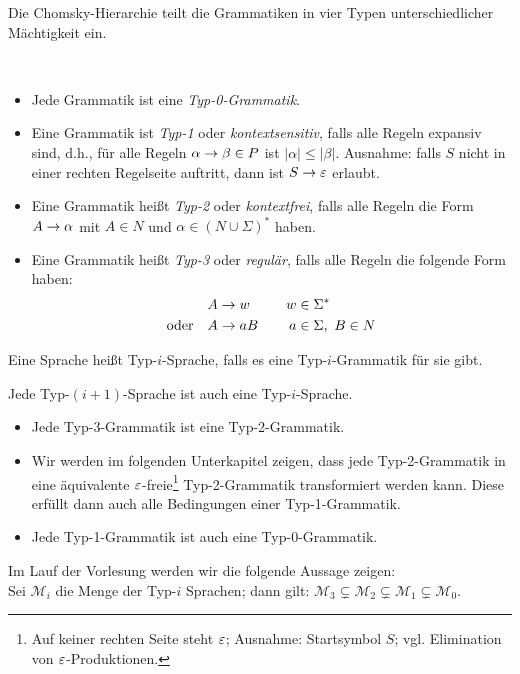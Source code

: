 \bigskip

Die Chomsky-Hierarchie teilt die Grammatiken in vier Typen unterschiedlicher Mächtigkeit ein.
\begin{Def}\
	\begin{itemize}
	\item Jede Grammatik ist eine \emph{Typ-0-Grammatik}.
	\item Eine Grammatik ist \emph{Typ-1} oder
          \emph{kontextsensitiv}, falls alle Regeln expansiv sind,
          d.h., für alle Regeln $\alpha\->\beta\in P$ ist
          $|\alpha|\leq |\beta|$. Ausnahme: falls $S$ nicht in einer
          rechten Regelseite auftritt, dann ist $S\->\Eps$ erlaubt. 
	\item Eine Grammatik heißt \emph{Typ-2} oder \emph{kontextfrei}, falls alle Regeln die Form $A\->\alpha$ mit $A\in N$ und $\alpha\in(N\cup\Sigma)^*$ haben.
	\item Eine Grammatik heißt \emph{Typ-3} oder \emph{regulär}, falls alle Regeln die folgende Form haben:
	\begin{alignat*}{2}
		&A\->w &\quad w&\in\Sigma^*\\
		\text{oder}\quad &A\->aB& a&\in\Sigma,\ B\in N
	\end{alignat*}
	\end{itemize}
	Eine Sprache heißt Typ-$i$-Sprache, falls es eine Typ-$i$-Grammatik für sie gibt.
\end{Def}

\begin{Beobachtung}
	Jede Typ-$(i+1)$-Sprache ist auch eine Typ-$i$-Sprache.
\end{Beobachtung}
\begin{itemize}
 \item Jede Typ-3-Grammatik ist eine Typ-2-Grammatik.
 \item Wir werden im folgenden Unterkapitel zeigen, dass jede Typ-2-Grammatik in eine äquivalente $\varepsilon$-freie\footnote{Auf keiner rechten Seite steht $\varepsilon$; Ausnahme: Startsymbol $S$; vgl. Elimination von $\varepsilon$-Produktionen.} Typ-2-Grammatik transformiert werden kann.
 Diese erfüllt dann auch alle Bedingungen einer Typ-1-Grammatik.
 \item Jede Typ-1-Grammatik ist auch eine Typ-0-Grammatik.
\end{itemize}

Im Lauf der Vorlesung werden wir die folgende Aussage zeigen:\\
Sei $\mathcal{M}_i$ die Menge der Typ-$i$ Sprachen; dann gilt: 
$\mathcal{M}_3 \subsetneq \mathcal{M}_2 \subsetneq\mathcal{M}_1 \subsetneq\mathcal{M}_0$.




